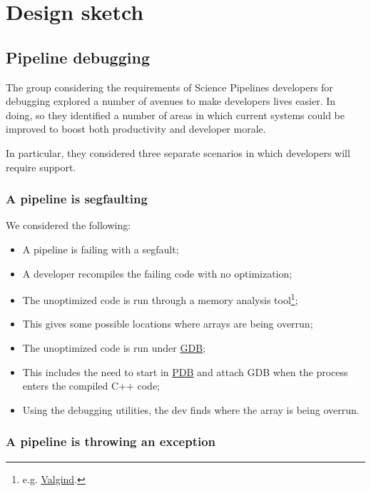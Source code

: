 \section{Design sketch}
\label{sec:design}

\subsection{Pipeline debugging}
\label{sec:design:debug}


The group considering the requirements of Science Pipelines developers for
debugging explored a number of avenues to make developers lives easier. In
doing, so they identified a number of areas in which current systems could be
improved to boost both productivity and developer morale.

In particular, they considered three separate scenarios in which developers
will require support.

\subsubsection{A pipeline is segfaulting}

We considered the following:

\begin{itemize}

\item{A pipeline is failing with a segfault;}
\item{A developer recompiles the failing code with no optimization;}
\item{The unoptimized code is run through a memory analysis tool\footnote{e.g. \href{http://valgrind.org}{Valgind}.};}
\item{This gives some possible locations where arrays are being overrun;}
\item{The unoptimized code is run under \href{https://www.gnu.org/software/gdb/}{GDB};}
\item{This includes the need to start in \href{https://docs.python.org/3/library/pdb.html}{PDB} and attach GDB when the process enters the compiled C++ code;}
\item{Using the debugging utilities, the dev finds where the array is being overrun.}

\end{itemize}


\subsubsection{A pipeline is throwing an exception}

